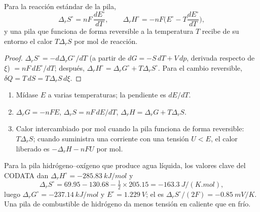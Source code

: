 \begin{proposition}\label{prop:b2:cell-thermodynamics:entropy}
Para la reacción estándar de la pila,
\[
  \Delta_r S^\circ = nF\,\frac{dE^\circ}{dT}, \qquad
  \Delta_r H^\circ = -nF\Big(E^\circ - T\frac{dE^\circ}{dT}\Big),
\]
y una pila que funciona de forma reversible a la temperatura $T$ recibe de su
entorno el calor $T\Delta_r S$ por mol de reacción.
\end{proposition}

\begin{proof}
$\Delta_r S^\circ = -d\Delta_r G^\circ/dT$ (a partir de $dG = -S\,dT + V\,dp$, derivada
respecto de $\xi$) $= nF\,dE^\circ/dT$; después, $\Delta_r H^\circ = \Delta_r G^\circ
+ T\Delta_r S^\circ$. Para el cambio reversible, $\delta Q = T\,dS = T\Delta_r S\,
d\xi$.
\end{proof}

\begin{method}\label{met:b2:cell-thermodynamics:cell-data}
\begin{enumerate}
  \item Mídase $E$ a varias temperaturas; la pendiente es $dE/dT$.
  \item $\Delta_r G = -nFE$, $\Delta_r S = nF\,dE/dT$, $\Delta_r H = \Delta_r G +
        T\Delta_r S$.
  \item Calor intercambiado por mol cuando la pila funciona de forma reversible: $T\Delta_r S$;
        cuando suministra una corriente con una tensión $U < E$, el calor liberado es
        $-\Delta_r H - nFU$ por mol.
\end{enumerate}
\end{method}

Para la pila hidrógeno--oxígeno que produce agua líquida, los valores clave del CODATA
dan $\Delta_r H^\circ = \qty{-285.83}{kJ/mol}$ y
\[
  \Delta_r S^\circ = 69.95 - 130.68 - \tfrac12 \times 205.15 = \qty{-163.3}{J/(K.mol)} ,
\]
luego $\Delta_r G^\circ = \qty{-237.14}{kJ/mol}$ y $E^\circ = \qty{1.229}{V}$; el
 es $\Delta_r S^\circ/(2F) = \qty{-0.85}{mV/K}$. Una pila de combustible de hidrógeno da menos
tensión en caliente que en frío.

